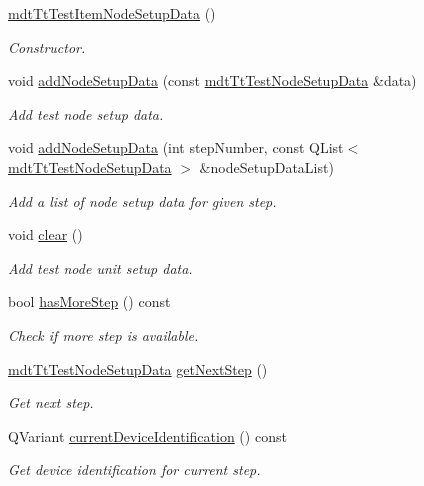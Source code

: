 \begin{DoxyCompactItemize}
\item 
\hyperlink{classmdt_tt_test_item_node_setup_data_a5a833d47755b0e0cd42a497837154add}{mdt\-Tt\-Test\-Item\-Node\-Setup\-Data} ()
\begin{DoxyCompactList}\small\item\em Constructor. \end{DoxyCompactList}\item 
void \hyperlink{classmdt_tt_test_item_node_setup_data_a2c58ca8c543b503e7d96d3f13112078f}{add\-Node\-Setup\-Data} (const \hyperlink{classmdt_tt_test_node_setup_data}{mdt\-Tt\-Test\-Node\-Setup\-Data} \&data)
\begin{DoxyCompactList}\small\item\em Add test node setup data. \end{DoxyCompactList}\item 
void \hyperlink{classmdt_tt_test_item_node_setup_data_a078eca82d6f55028676bae956e75ea1e}{add\-Node\-Setup\-Data} (int step\-Number, const Q\-List$<$ \hyperlink{classmdt_tt_test_node_setup_data}{mdt\-Tt\-Test\-Node\-Setup\-Data} $>$ \&node\-Setup\-Data\-List)
\begin{DoxyCompactList}\small\item\em Add a list of node setup data for given step. \end{DoxyCompactList}\item 
void \hyperlink{classmdt_tt_test_item_node_setup_data_a1e3ed3490ff43e90a4fea2256af8e4d2}{clear} ()
\begin{DoxyCompactList}\small\item\em Add test node unit setup data. \end{DoxyCompactList}\item 
bool \hyperlink{classmdt_tt_test_item_node_setup_data_ac3b94d30bf38bdb189d888a62b09b34d}{has\-More\-Step} () const 
\begin{DoxyCompactList}\small\item\em Check if more step is available. \end{DoxyCompactList}\item 
\hyperlink{classmdt_tt_test_node_setup_data}{mdt\-Tt\-Test\-Node\-Setup\-Data} \hyperlink{classmdt_tt_test_item_node_setup_data_a6b76f7d05863790639b1840cf2ca3f4c}{get\-Next\-Step} ()
\begin{DoxyCompactList}\small\item\em Get next step. \end{DoxyCompactList}\item 
Q\-Variant \hyperlink{classmdt_tt_test_item_node_setup_data_a8f34d5d3b6f2ad8d011edd7c070b9962}{current\-Device\-Identification} () const 
\begin{DoxyCompactList}\small\item\em Get device identification for current step. \end{DoxyCompactList}\end{DoxyCompactItemize}


